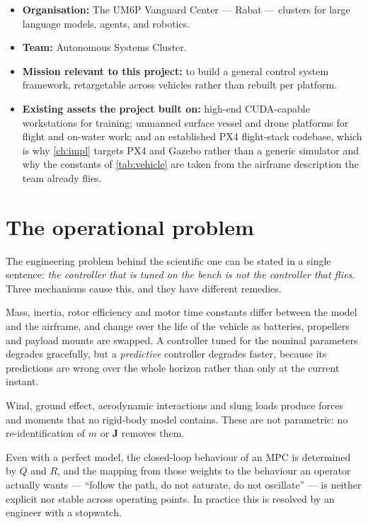 \documentclass[11pt,a4paper,twoside,openright]{report}
\newcommand{\HostOrg}{The UM6P Vanguard Center --- Rabat}
\newcommand{\HostTeam}{Autonomous Systems Cluster}
\newcommand{\mat}[1]{\bm{#1}}
\theoremstyle{plain}
\theoremstyle{definition}
\theoremstyle{remark}
\begin{document}
	\begin{itemize}[nosep]
		\item \textbf{Organisation:} \HostOrg{} --- clusters for large language
		models, agents, and robotics.
		\item \textbf{Team:} \HostTeam.
		\item \textbf{Mission relevant to this project:} to build a general
		control system framework, retargetable across vehicles rather than
		rebuilt per platform.
		\item \textbf{Existing assets the project built on:} high-end
		CUDA-capable workstations for training; unmanned surface vessel and
		drone platforms for flight and on-water work; and an established PX4
		flight-stack codebase, which is why \cref{ch:impl} targets PX4 and
		Gazebo rather than a generic simulator and why the constants of
		\cref{tab:vehicle} are taken from the airframe description the team
		already flies.
	\end{itemize}

	\section{The operational problem}

	The engineering problem behind the scientific one can be stated in a single
	sentence: \emph{the controller that is tuned on the bench is not the controller
		that flies}. Three mechanisms cause this, and they have different remedies.

	\begin{description}[leftmargin=*,style=nextline]
		\item[Parametric drift.] Mass, inertia, rotor efficiency and motor time
		constants differ between the model and the airframe, and change over the life
		of the vehicle as batteries, propellers and payload mounts are swapped. A
		controller tuned for the nominal parameters degrades gracefully, but a
		\emph{predictive} controller degrades faster, because its predictions are
		wrong over the whole horizon rather than only at the current instant.
		\item[Unmodelled external effects.] Wind, ground effect, aerodynamic
		interactions and slung loads produce forces and moments that no rigid-body
		model contains. These are not parametric: no re-identification of $m$ or
		$\mat J$ removes them.
		\item[Cost-design opacity.] Even with a perfect model, the closed-loop behaviour
		of an MPC is determined by $Q$ and $R$, and the mapping from those weights to
		the behaviour an operator actually wants --- ``follow the path, do not
		saturate, do not oscillate'' --- is neither explicit nor stable across
		operating points. In practice this is resolved by an engineer with a
		stopwatch.
	\end{description}
\end{document}
